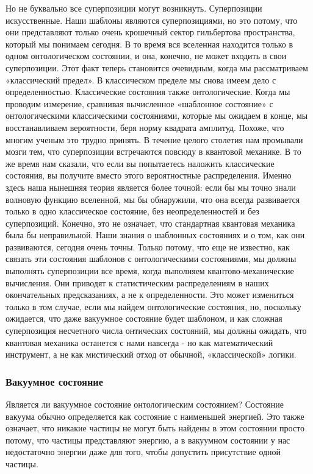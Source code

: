 \documentclass[main.tex]{subfiles}
\begin{document}
Но не буквально все суперпозиции могут возникнуть. Суперпозиции искусственные. Наши шаблоны являются суперпозициями, но это потому, что они представляют только очень крошечный сектор гильбертова пространства, который мы понимаем сегодня. В то время вся вселенная находится только в одном онтологическом состоянии, и она, конечно, не может входить в свои суперпозиции. Этот факт теперь становится очевидным, когда мы рассматриваем «классический предел». В классическом пределе мы снова имеем дело с определенностью. Классические состояния также онтологические. Когда мы проводим измерение, сравнивая вычисленное «шаблонное состояние» с онтологическими классическими состояниями, которые мы ожидаем в конце, мы восстанавливаем вероятности, беря норму квадрата амплитуд.
Похоже, что многим ученым это трудно принять. В течение целого столетия нам промывали мозги тем, что суперпозиции встречаются повсюду в квантовой механике. В то же время нам сказали, что если вы попытаетесь наложить классические состояния, вы получите вместо этого вероятностные распределения. Именно здесь наша нынешняя теория является более точной: если бы мы точно знали волновую функцию вселенной, мы бы обнаружили, что она всегда развивается только в одно классическое состояние, без неопределенностей и без суперпозиций.
Конечно, это не означает, что стандартная квантовая механика была бы неправильной. Наши знания о шаблонных состояниях и о том, как они развиваются, сегодня очень точны. Только потому, что еще не известно, как связать эти состояния шаблонов с онтологическими состояниями, мы должны выполнять суперпозиции все время, когда выполняем квантово-механические вычисления. Они приводят к статистическим распределениям в наших окончательных предсказаниях, а не к определенности. Это может измениться только в том случае, если мы найдем онтологические состояния, но, поскольку ожидается, что даже вакуумное состояние будет шаблоном, и как сложная суперпозиция несчетного числа онтических состояний, мы должны ожидать, что квантовая механика останется с нами навсегда - но как математический инструмент, а не как мистический отход от обычной, «классической» логики.

\subsubsection{Вакуумное состояние}\label{ch5.7.5}

Является ли вакуумное состояние онтологическим состоянием? Состояние вакуума обычно определяется как состояние с наименьшей энергией. Это также означает, что никакие частицы не могут быть найдены в этом состоянии просто потому, что частицы представляют энергию, а в вакуумном состоянии у нас недостаточно энергии даже для того, чтобы допустить присутствие одной частицы.
\end{document}
